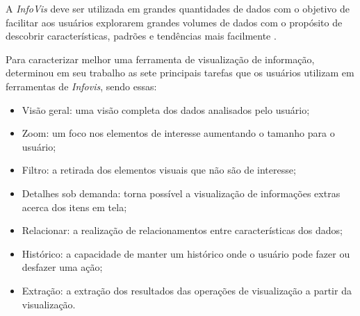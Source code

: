\documentclass[
	12pt,				%
	openright,			%
	oneside,			%
	a4paper,			%
	english,			%
	brazil				%
	]{abntex2}
\begin{document}
A  \textit{InfoVis} deve ser utilizada em grandes quantidades de dados com o objetivo de facilitar aos usuários explorarem grandes volumes de dados com o propósito de descobrir características, padrões e tendências mais facilmente \cite{Konstan}.


Para caracterizar melhor uma ferramenta de visualização de informação, \cite{Shneiderman1996} determinou em seu trabalho as sete principais tarefas que os usuários utilizam em ferramentas de \textit{Infovis}, sendo essas:
\begin{itemize}
    \item  Visão geral: uma visão completa dos dados analisados pelo usuário;
    \item  Zoom: um foco nos elementos de interesse aumentando o tamanho para o usuário;
    \item  Filtro: a retirada dos elementos visuais que não são de interesse;
    \item  Detalhes sob demanda: torna possível a visualização de informações extras acerca dos itens em tela;
    \item  Relacionar: a realização de relacionamentos entre 
    características dos dados;
    \item  Histórico: a capacidade de manter um histórico onde o usuário pode fazer ou desfazer uma ação;
    \item  Extração: a extração dos resultados das operações de visualização a partir da visualização.
\end{itemize}
 
\end{document}
